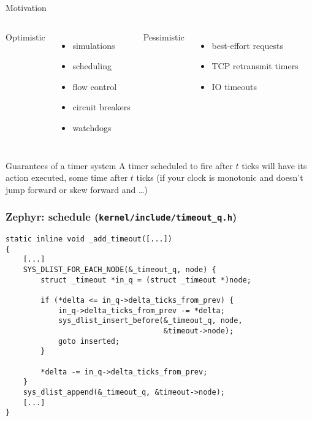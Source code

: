 \documentclass{beamer}
\begin{document}
\begin{frame}{Motivation}
  \begin{columns}
    \centering
    Optimistic\\[.2cm]
    \begin{itemize}
      \item simulations
      \item scheduling
      \item flow control
      \item circuit breakers
      \item watchdogs
    \end{itemize}
    \centering
    Pessimistic\\[.2cm]
    \begin{itemize}
    \item best-effort requests
    \item TCP retransmit timers
    \item IO timeouts
    \end{itemize}
  \end{columns}
\end{frame}

\begin{frame}{Guarantees of a timer system}
  A timer scheduled to fire after $t$ ticks will have its action
  executed, some time after $t$ ticks (if your clock is monotonic and
  doesn't jump forward or skew forward and \ldots)
\end{frame}

\begin{frame}[t,fragile]
  \frametitle{Zephyr: schedule (\texttt{kernel/include/timeout\_q.h})}

\begin{verbatim}
static inline void _add_timeout([...])
{
    [...]
    SYS_DLIST_FOR_EACH_NODE(&_timeout_q, node) {
        struct _timeout *in_q = (struct _timeout *)node;

        if (*delta <= in_q->delta_ticks_from_prev) {
            in_q->delta_ticks_from_prev -= *delta;
            sys_dlist_insert_before(&_timeout_q, node,
                                    &timeout->node);
            goto inserted;
        }

        *delta -= in_q->delta_ticks_from_prev;
    }
    sys_dlist_append(&_timeout_q, &timeout->node);
    [...]
}
\end{verbatim}
\end{frame}
\end{document}
